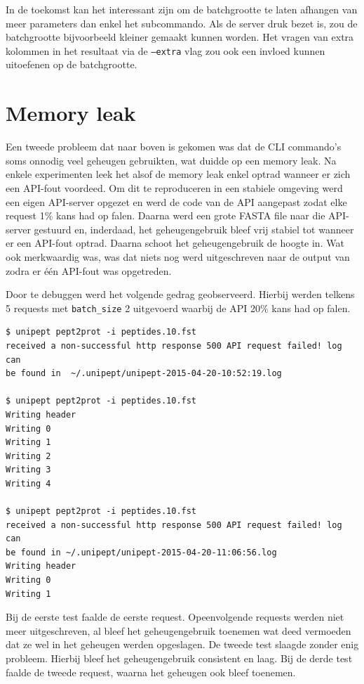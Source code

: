 In de toekomst kan het interessant zijn om de batchgrootte te laten afhangen van
meer parameters dan enkel het subcommando. Als de server druk bezet is, zou de
batchgrootte bijvoorbeeld kleiner gemaakt kunnen worden. Het vragen van extra
kolommen in het resultaat via de \texttt{--extra} vlag zou ook een invloed
kunnen uitoefenen op de batchgrootte.

\section{Memory leak}
Een tweede probleem dat naar boven is gekomen was dat de CLI commando's soms
onnodig veel geheugen gebruikten, wat duidde op een memory leak. Na enkele
experimenten leek het alsof de memory leak enkel optrad wanneer er zich een
API-fout voordeed. Om dit te reproduceren in een stabiele omgeving werd een
eigen API-server opgezet en werd de code van de API aangepast zodat elke request
1\% kans had op falen. Daarna werd een grote FASTA file naar die API-server
gestuurd en, inderdaad, het geheugengebruik bleef vrij stabiel tot wanneer er
een API-fout optrad. Daarna schoot het geheugengebruik de hoogte in. Wat ook
merkwaardig was, was dat niets nog werd uitgeschreven naar de output van zodra
er één API-fout was opgetreden.

Door te debuggen werd het volgende 
gedrag geobserveerd. Hierbij werden telkens 5 requests met \texttt{batch\_size} 
2 uitgevoerd waarbij de API 20\% kans had op falen.

\begin{lstlisting}
$ unipept pept2prot -i peptides.10.fst
received a non-successful http response 500 API request failed! log can 
be found in  ~/.unipept/unipept-2015-04-20-10:52:19.log

$ unipept pept2prot -i peptides.10.fst
Writing header
Writing 0
Writing 1
Writing 2
Writing 3
Writing 4

$ unipept pept2prot -i peptides.10.fst
received a non-successful http response 500 API request failed! log can 
be found in ~/.unipept/unipept-2015-04-20-11:06:56.log
Writing header
Writing 0
Writing 1
\end{lstlisting}

Bij de eerste test faalde de eerste request. Opeenvolgende requests werden niet 
meer uitgeschreven, al bleef het geheugengebruik toenemen wat deed vermoeden 
dat ze 
wel in het geheugen werden opgeslagen. De tweede test slaagde zonder enig 
probleem. Hierbij bleef het geheugengebruik consistent en laag. Bij de derde 
test faalde de tweede request, waarna het geheugen ook bleef toenemen. 

